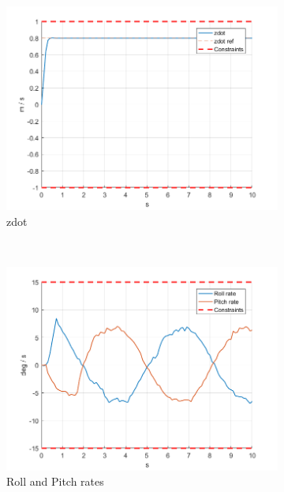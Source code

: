 \documentclass[11pt]{article}
\begin{document}
\begin{enumerate}
\begin{figure}[ht]
        \begin{subfigure}[c]{0.3\linewidth}
            \centering
            \includegraphics[width=\linewidth]{Plots_10_OffsetFreeTracking_Varying/04}
            \caption{zdot}
        \end{subfigure}
        ~
        \begin{subfigure}[c]{0.3\linewidth}
            \centering
            \includegraphics[width=\linewidth]{Plots_10_OffsetFreeTracking_Varying/05}
            \caption{Roll and Pitch rates}
        \end{subfigure}
        ~
        \begin{subfigure}[c]{0.3\linewidth}
            \centering

\end{subfigure}
\end{figure}
\end{enumerate}
\end{document}
